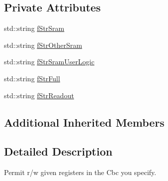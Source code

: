 \subsection*{Private Attributes}
\begin{DoxyCompactItemize}
\item 
std\-::string \hyperlink{class_ph2___hw_interface_1_1_cbc_interface_aaddc36b6ef3360c0a99da44c53a3242f}{f\-Str\-Sram}
\item 
std\-::string \hyperlink{class_ph2___hw_interface_1_1_cbc_interface_a3277ad84e5806e7992563dbb6122fdb9}{f\-Str\-Other\-Sram}
\item 
std\-::string \hyperlink{class_ph2___hw_interface_1_1_cbc_interface_a61c9447688cc556e33d7051c26459755}{f\-Str\-Sram\-User\-Logic}
\item 
std\-::string \hyperlink{class_ph2___hw_interface_1_1_cbc_interface_a72fbeb3befe9e533fc21cc568e540df4}{f\-Str\-Full}
\item 
std\-::string \hyperlink{class_ph2___hw_interface_1_1_cbc_interface_ade4f2642613500ee5f1963c22509c48b}{f\-Str\-Readout}
\end{DoxyCompactItemize}
\subsection*{Additional Inherited Members}


\subsection{Detailed Description}
Permit r/w given registers in the Cbc you specify. 

